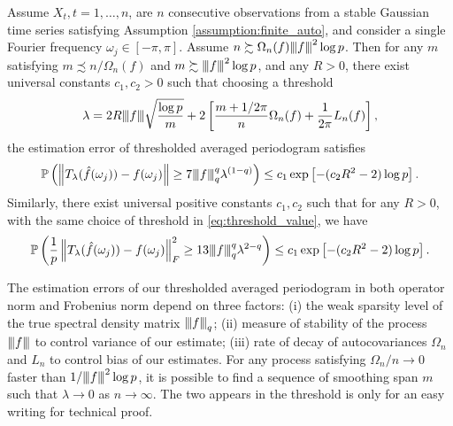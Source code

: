 \begin{prop}
\label{prop: gauss_prop}
Assume ${X}_t, t=1,\ldots,n$, are $n$ consecutive observations from a stable Gaussian time series satisfying Assumption \ref{assumption:finite_auto}, and consider a single Fourier frequency $\omega_j \in [-\pi, \pi]$. Assume $n \succsim \Omega_n(f) {\left\vert\kern-0.25ex\left\vert\kern-0.25ex\left\vert f \right\vert\kern-0.25ex\right\vert\kern-0.25ex\right\vert}^2 \log p$. Then for any $m $ satisfying $m \precsim n/ \Omega_n(f)$ and $m \succsim {\left\vert\kern-0.25ex\left\vert\kern-0.25ex\left\vert f \right\vert\kern-0.25ex\right\vert\kern-0.25ex\right\vert}^2 \log p$, and any $R > 0$,  
there exist universal constants $c_1, c_2 > 0$ such that choosing a threshold 
\begin{equation}
\label{eq:threshold_value}
\lambda = 2R {\left\vert\kern-0.25ex\left\vert\kern-0.25ex\left\vert f \right\vert\kern-0.25ex\right\vert\kern-0.25ex\right\vert}\sqrt{\frac{\log p}{m}} +2\left[ \frac{m+1/2\pi}{n}\Omega_n(f)+\frac{1}{2\pi}L_n(f)\right], 
\end{equation}
the estimation error of thresholded averaged periodogram satisfies 
\begin{equation}
\begin{aligned}
\mathbb{P}\left(\left\|T_{\lambda}(\hat{f}(\omega_j)) - f(\omega_j)\right\|\ge 7{\left\vert\kern-0.25ex\left\vert\kern-0.25ex\left\vert f \right\vert\kern-0.25ex\right\vert\kern-0.25ex\right\vert}_q^q \lambda^{(1-q)} \right)
\le c_1 \exp\left[-(c_2 R^2-2)\log p\right]. \nonumber
\end{aligned}
\end{equation}
Similarly, there exist universal positive constants $c_1, c_2$ such that for any $R>0$, with the same choice of threshold in \eqref{eq:threshold_value}, we have 
\begin{equation}
\mathbb{P}\left(\frac{1}{p}\left\|T_{\lambda}(\hat{f}(\omega_j)) - f(\omega_j)\right\|_F^2 \ge 13{\left\vert\kern-0.25ex\left\vert\kern-0.25ex\left\vert f \right\vert\kern-0.25ex\right\vert\kern-0.25ex\right\vert}_q^q\lambda^{2-q} \right)\le c_1 \exp\left[-(c_2 R^2-2)\log p\right]. \nonumber
\end{equation}
\end{prop}

\begin{remark}
The estimation errors of our thresholded averaged periodogram in both operator norm and Frobenius norm depend on three factors: (i) the weak sparsity level of the true spectral density matrix ${\left\vert\kern-0.25ex\left\vert\kern-0.25ex\left\vert f \right\vert\kern-0.25ex\right\vert\kern-0.25ex\right\vert}_q$; (ii) measure of stability of the process ${\left\vert\kern-0.25ex\left\vert\kern-0.25ex\left\vert f \right\vert\kern-0.25ex\right\vert\kern-0.25ex\right\vert}$ to control variance of our estimate; (iii) rate of decay of autocovariances $\Omega_n$ and $L_n$ to control bias of our estimates. For any process satisfying $\Omega_n/n \rightarrow 0$ faster than $1/{\left\vert\kern-0.25ex\left\vert\kern-0.25ex\left\vert f \right\vert\kern-0.25ex\right\vert\kern-0.25ex\right\vert}^2 \log p$, it is possible to find a sequence of smoothing span $m$ such that $\lambda \rightarrow 0$ as $n\rightarrow \infty$. The two appears in the threshold is only for an easy writing for technical proof. 
\end{remark}

